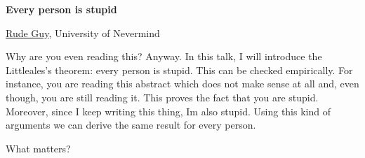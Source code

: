 \documentclass[a4paper, 11pt]{article}
\newcommand{\abstracttitle}[1]{{ \centering \LARGE \textbf{#1}\\ \vspace*{0.7cm} }}
\newcommand{\firstauthor}[2]{{ \centering \underline{#1}, \textsf{#2}\\ \vspace*{0.25cm} }}
\newcommand{\otherauthor}[2]{{ \centering #1, \textsf{#2}\\ \vspace*{0.25cm} }}
\newcommand{\abstracttext}[1]{ \vspace{0.6cm} #1 }
\begin{document}
\abstracttitle{Every person is stupid}

\firstauthor{Rude Guy}{University of Nevermind}

\abstracttext{
    Why are you even reading this? Anyway. In this talk, I will introduce the Littleales's theorem: every person is stupid. This can be checked empirically. For instance, you are reading this abstract which does not make sense at all and, even though, you are still reading it. This proves the fact that you are stupid. Moreover, since I keep writing this thing, Im also stupid. Using this kind of arguments we can derive the same result for every person.
}

\begin{thebibliography}{9}
What matters?
\end{thebibliography}
\end{document}
